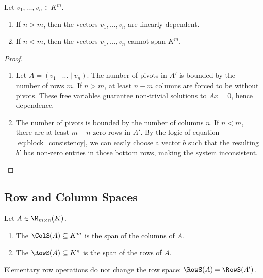 \begin{theorem}
\label{thm:coordinate_constraints}
Let $v_{1}, \dots, v_{n} \in K^{m}$.
\begin{enumerate}
    \item If $n > m$, then the vectors $v_{1}, \dots, v_{n}$ are linearly dependent.
    \item If $n < m$, then the vectors $v_{1}, \dots, v_{n}$ cannot span $K^{m}$.
\end{enumerate}
\end{theorem}

\begin{proof}
\begin{enumerate}
    \item Let $A = (v_{1} \mid \dots \mid v_{n})$. The number of pivots in $A'$ is bounded by the number of rows $m$. If $n > m$, at least $n - m$ columns are forced to be without pivots. These free variables guarantee non-trivial solutions to $Ax = 0$, hence dependence.
    \item The number of pivots is bounded by the number of columns $n$. If $n < m$, there are at least $m - n$ zero-rows in $A'$. By the logic of equation \eqref{eq:block_consistency}, we can easily choose a vector $b$ such that the resulting $b'$ has non-zero entries in those bottom rows, making the system inconsistent.
\end{enumerate}
\end{proof}

\subsection{Row and Column Spaces}

\begin{definition}
\label{def:matrix_subspaces}
Let $A \in \M_{m \times n}(K)$.
\begin{enumerate}
\item The  $\ColS(A) \subseteq K^{m}$ is the span of the columns of $A$.
\item The  $\RowS(A) \subseteq K^{n}$ is the span of the rows of $A$.
\end{enumerate}
\end{definition}

\begin{proposition}
\label{prop:row_space_invariance}
Elementary row operations do not change the row space: $\RowS(A) = \RowS(A')$.
\end{proposition}

